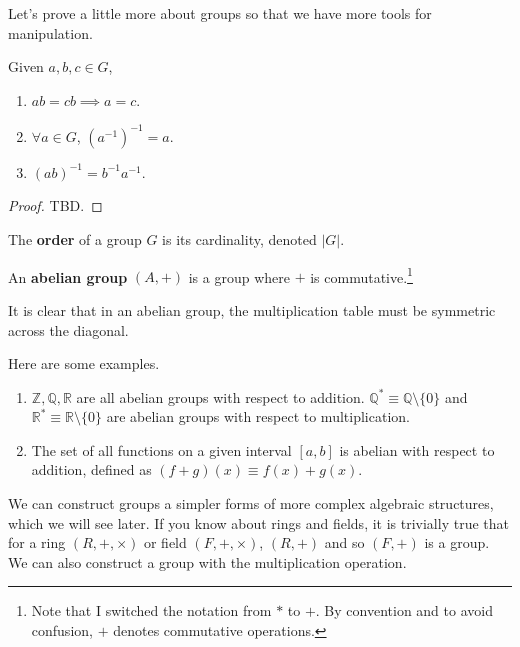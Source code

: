   Let's prove a little more about groups so that we have more tools for manipulation. 

  \begin{lemma}
    Given $a, b, c \in G$, 
    \begin{enumerate}
      \item $ab = cb \implies a = c$. 
      \item $\forall a \in G$, $(a^{-1})^{-1} = a$. 
      \item $(ab)^{-1} = b^{-1} a^{-1}$. 
    \end{enumerate}
  \end{lemma}
  \begin{proof}
    TBD. 
  \end{proof}

  \begin{definition}
    The \textbf{order} of a group $G$ is its cardinality, denoted $|G|$. 
  \end{definition} 

  \begin{definition}
    An \textbf{abelian group} $(A, +)$ is a group where $+$ is commutative.\footnote{Note that I switched the notation from $\ast$ to $+$. By convention and to avoid confusion, $+$ denotes commutative operations. }
  \end{definition} 

  It is clear that in an abelian group, the multiplication table must be symmetric across the diagonal. 

  \begin{example}
    Here are some examples. 
    \begin{enumerate}
      \item $\mathbb{Z}, \mathbb{Q}, \mathbb{R}$ are all abelian groups with respect to addition. $\mathbb{Q}^{*} \equiv \mathbb{Q} \setminus \{0\}$ and $\mathbb{R}^{*} \equiv \mathbb{R} \setminus \{0\}$ are abelian groups with respect to multiplication.
      \item The set of all functions on a given interval $[a,b]$ is abelian with respect to addition, defined as $(f+g)(x) \equiv f(x) + g(x)$. 
    \end{enumerate}
  \end{example} 

  We can construct groups a simpler forms of more complex algebraic structures, which we will see later. If you know about rings and fields, it is trivially true that for a ring $(R, +, \times)$ or field $(F, +, \times)$, $(R, +)$ and so $(F, +)$ is a group. We can also construct a group with the multiplication operation. 

